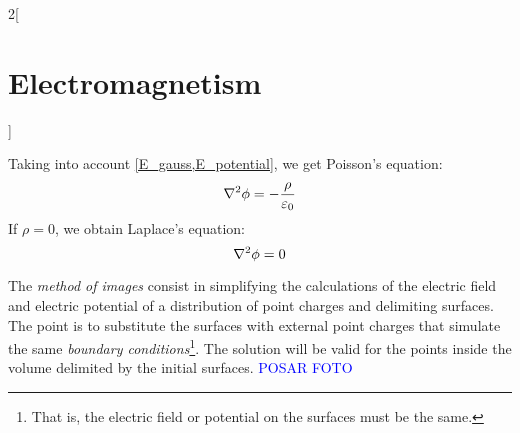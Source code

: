 \documentclass[../../../main.tex]{subfiles}
\begin{document}
\begin{multicols}{2}[\section{Electromagnetism}]
\begin{definition}
  \end{definition}
  \begin{prop}
    Taking into account \cref{E_gauss,E_potential}, we get Poisson's equation: $$\laplacian\phi=-\frac{\rho}{\varepsilon_0}$$ If $\rho=0$, we obtain Laplace's equation: $$\laplacian\phi=0$$
  \end{prop}
  \begin{prop}
    The \emph{method of images} consist in simplifying the calculations of the electric field and electric potential of a distribution of point charges and delimiting surfaces. The point is to substitute the surfaces with external point charges that simulate the same \emph{boundary conditions}\footnote{That is, the electric field or potential on the surfaces must be the same.}. The solution will be valid for the points inside the volume delimited by the initial surfaces. \textcolor{blue}{POSAR FOTO}
  \end{prop}

\end{multicols}
\end{document}
